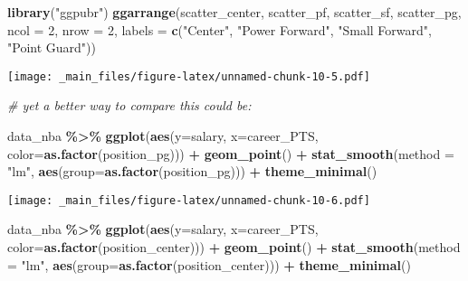 \documentclass[
]{book}
\newenvironment{Shaded}{\begin{snugshade}}{\end{snugshade}}
\newcommand{\AttributeTok}[1]{\textcolor[rgb]{0.13,0.29,0.53}{#1}}
\newcommand{\CommentTok}[1]{\textcolor[rgb]{0.56,0.35,0.01}{\textit{#1}}}
\newcommand{\DecValTok}[1]{\textcolor[rgb]{0.00,0.00,0.81}{#1}}
\newcommand{\FunctionTok}[1]{\textcolor[rgb]{0.13,0.29,0.53}{\textbf{#1}}}
\newcommand{\NormalTok}[1]{#1}
\newcommand{\SpecialCharTok}[1]{\textcolor[rgb]{0.81,0.36,0.00}{\textbf{#1}}}
\newcommand{\StringTok}[1]{\textcolor[rgb]{0.31,0.60,0.02}{#1}}
\begin{document}
\begin{Shaded}
\begin{Highlighting}[]
\FunctionTok{library}\NormalTok{(}\StringTok{"ggpubr"}\NormalTok{)}
\FunctionTok{ggarrange}\NormalTok{(scatter\_center, scatter\_pf,}
\NormalTok{          scatter\_sf, scatter\_pg,}
          \AttributeTok{ncol =} \DecValTok{2}\NormalTok{, }\AttributeTok{nrow =} \DecValTok{2}\NormalTok{,}
          \AttributeTok{labels =} \FunctionTok{c}\NormalTok{(}\StringTok{"Center"}\NormalTok{,}
                     \StringTok{"Power Forward"}\NormalTok{,}
                     \StringTok{"Small Forward"}\NormalTok{,}
                     \StringTok{"Point Guard"}\NormalTok{))}
\end{Highlighting}
\end{Shaded}

\texttt{[image: \_main\_files/figure-latex/unnamed-chunk-10-5.pdf]}

\begin{Shaded}
\begin{Highlighting}[]
\CommentTok{\# yet a better way to compare this could be:}

\NormalTok{data\_nba }\SpecialCharTok{\%\textgreater{}\%} 
  \FunctionTok{ggplot}\NormalTok{(}\FunctionTok{aes}\NormalTok{(}\AttributeTok{y=}\NormalTok{salary, }\AttributeTok{x=}\NormalTok{career\_PTS, }\AttributeTok{color=}\FunctionTok{as.factor}\NormalTok{(position\_pg))) }\SpecialCharTok{+}
    \FunctionTok{geom\_point}\NormalTok{() }\SpecialCharTok{+} 
     \FunctionTok{stat\_smooth}\NormalTok{(}\AttributeTok{method =} \StringTok{"lm"}\NormalTok{,}
                 \FunctionTok{aes}\NormalTok{(}\AttributeTok{group=}\FunctionTok{as.factor}\NormalTok{(position\_pg))) }\SpecialCharTok{+} 
       \FunctionTok{theme\_minimal}\NormalTok{()}
\end{Highlighting}
\end{Shaded}

\texttt{[image: \_main\_files/figure-latex/unnamed-chunk-10-6.pdf]}

\begin{Shaded}
\begin{Highlighting}[]
\NormalTok{data\_nba }\SpecialCharTok{\%\textgreater{}\%} 
  \FunctionTok{ggplot}\NormalTok{(}\FunctionTok{aes}\NormalTok{(}\AttributeTok{y=}\NormalTok{salary, }\AttributeTok{x=}\NormalTok{career\_PTS, }\AttributeTok{color=}\FunctionTok{as.factor}\NormalTok{(position\_center))) }\SpecialCharTok{+}
    \FunctionTok{geom\_point}\NormalTok{() }\SpecialCharTok{+} 
     \FunctionTok{stat\_smooth}\NormalTok{(}\AttributeTok{method =} \StringTok{"lm"}\NormalTok{,}
                 \FunctionTok{aes}\NormalTok{(}\AttributeTok{group=}\FunctionTok{as.factor}\NormalTok{(position\_center))) }\SpecialCharTok{+} 
       \FunctionTok{theme\_minimal}\NormalTok{()}
\end{Highlighting}
\end{Shaded}
\end{document}
